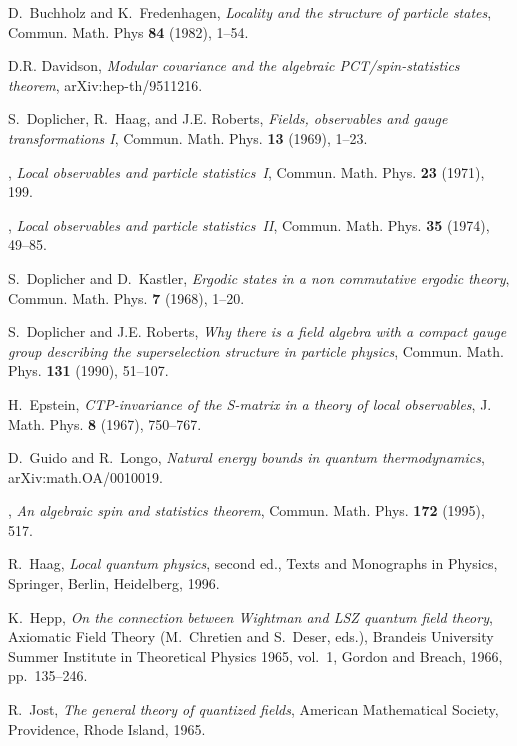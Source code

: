 \documentclass[a4paper,reqno,11pt]{amsart}
\theoremstyle{plain}
\theoremstyle{definition}
\numberwithin{equation}{section}
\begin{document}
\begin{thebibliography}{10}
D.~Buchholz and K.~Fredenhagen, \emph{Locality and the structure of particle
  states}, Commun. Math. Phys \textbf{84} (1982), 1--54.

D.R. Davidson, \emph{Modular covariance and the algebraic {PCT}/spin-statistics
  theorem}, arXiv:hep-th/9511216.

S.~Doplicher, R.~Haag, and J.E. Roberts, \emph{Fields, observables and gauge
  transformations {I}}, Commun. Math. Phys. \textbf{13} (1969), 1--23.

\bysame, \emph{Local observables and particle statistics~{I}}, Commun. Math.
  Phys. \textbf{23} (1971), 199.

\bysame, \emph{Local observables and particle statistics~{II}}, Commun. Math.
  Phys. \textbf{35} (1974), 49--85.

S.~Doplicher and D.~Kastler, \emph{Ergodic states in a non commutative ergodic
  theory}, Commun. Math. Phys. \textbf{7} (1968), 1--20.

S.~Doplicher and J.E. Roberts, \emph{Why there is a field algebra with a
  compact gauge group describing the superselection structure in particle
  physics}, Commun. Math. Phys. \textbf{131} (1990), 51--107.

H.~Epstein, \emph{{CTP}-invariance of the {S}-matrix in a theory of local
  observables}, J. Math. Phys. \textbf{8} (1967), 750--767.

D.~Guido and R.~Longo, \emph{Natural energy bounds in quantum thermodynamics},
  arXiv:math.OA/0010019.

\bysame, \emph{An algebraic spin and statistics theorem}, Commun. Math. Phys.
  \textbf{172} (1995), 517.

R.~Haag, \emph{Local quantum physics}, second ed., Texts and Monographs in
  Physics, Springer, Berlin, Heidelberg, 1996.

K.~Hepp, \emph{On the connection between {W}ightman and {LSZ} quantum field
  theory}, Axiomatic Field Theory (M.~Chretien and S.~Deser, eds.), Brandeis
  University Summer Institute in Theoretical Physics 1965, vol.~1, Gordon and
  Breach, 1966, pp.~135--246.

R.~Jost, \emph{The general theory of quantized fields}, American Mathematical
  Society, Providence, Rhode Island, 1965.


\end{thebibliography}
\end{document}
